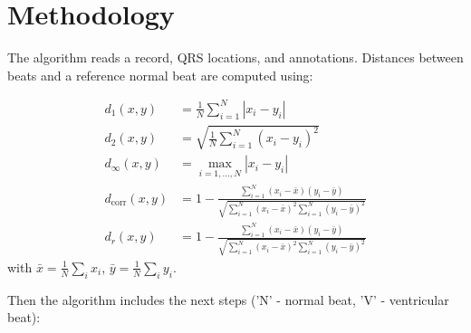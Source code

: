 \documentclass[conference]{IEEEtran}
\begin{document}
\section{Methodology}
The algorithm reads a record, QRS locations, and annotations. Distances between beats and a reference normal beat are computed using:

\begin{align}
    d_1(x, y) &= \frac{1}{N} \sum_{i=1}^{N} |x_i - y_i|\\
    d_2(x, y) &= \sqrt{\frac{1}{N} \sum_{i=1}^{N} (x_i - y_i)^2}\\
    d_\infty(x, y) &= \max_{i=1,\dots,N} |x_i - y_i|\\
    d_\text{corr}(x, y) &= 1 - \frac{\sum_{i=1}^{N} (x_i - \bar{x})(y_i - \bar{y})}
    {\sqrt{\sum_{i=1}^{N} (x_i - \bar{x})^2 \sum_{i=1}^{N} (y_i - \bar{y})^2}}\\
    d_r(x, y) &= 1 - \frac{\sum_{i=1}^{N} (x_i - \bar{x})(y_i - \bar{y})}
    {\sqrt{\sum_{i=1}^{N} (x_i - \bar{x})^2 \sum_{i=1}^{N} (y_i - \bar{y})^2}}
\end{align}
with $\bar{x}=\frac{1}{N}\sum_i x_i$, $\bar{y}=\frac{1}{N}\sum_i y_i$.


Then the algorithm includes the next steps ('N' - normal beat, 'V' - ventricular beat):
\end{document}
